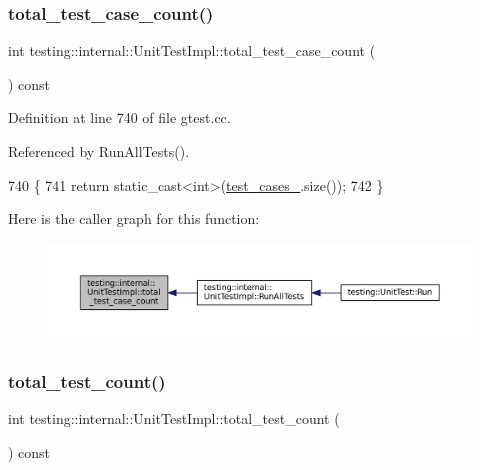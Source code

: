 \subsubsection{\texorpdfstring{total\+\_\+test\+\_\+case\+\_\+count()}{total\_test\_case\_count()}}
{\footnotesize\ttfamily int testing\+::internal\+::\+Unit\+Test\+Impl\+::total\+\_\+test\+\_\+case\+\_\+count (\begin{DoxyParamCaption}{ }\end{DoxyParamCaption}) const}



Definition at line 740 of file gtest.\+cc.



Referenced by Run\+All\+Tests().


\begin{DoxyCode}
740                                               \{
741   \textcolor{keywordflow}{return} \textcolor{keyword}{static\_cast<}\textcolor{keywordtype}{int}\textcolor{keyword}{>}(\hyperlink{classtesting_1_1internal_1_1UnitTestImpl_a79ec0f733ada2898efd1a7fbd8587fb3}{test\_cases\_}.size());
742 \}
\end{DoxyCode}
Here is the caller graph for this function\+:
\nopagebreak
\begin{figure}[H]
\begin{center}
\leavevmode
\includegraphics[width=350pt]{classtesting_1_1internal_1_1UnitTestImpl_ac1d81d6b146b2dbce460f9a0a57d4f9e_icgraph}
\end{center}
\end{figure}
\mbox{\label{classtesting_1_1internal_1_1UnitTestImpl_a89e8531ee2ba3f0aadc27a95ac6149f1}} 
\subsubsection{\texorpdfstring{total\+\_\+test\+\_\+count()}{total\_test\_count()}}
{\footnotesize\ttfamily int testing\+::internal\+::\+Unit\+Test\+Impl\+::total\+\_\+test\+\_\+count (\begin{DoxyParamCaption}{ }\end{DoxyParamCaption}) const}



